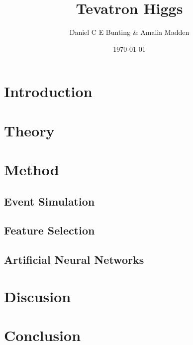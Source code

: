 \documentclass{article}
\title{Tevatron Higgs}
\author{ Daniel C E Bunting \& Amalia Madden}
\date{\today}
\begin{document}
\maketitle
\begin{abstract}
\end{abstract}

\section{Introduction} %
\label{sec:introduction}


\section{Theory} %
\label{sec:theory}





\section{Method} %
\label{sec:method}

\subsection{Event Simulation} %
\label{sub:event_simulation}


\subsection{Feature Selection} %
\label{sub:feature_selection}

\subsection{Artificial Neural Networks} %
\label{sub:artificial_neural_networks}



\section{Discusion} %
\label{sec:discusion}


\section{Conclusion} %
\label{sec:conclusion}






 

\clearpage
\end{document}

